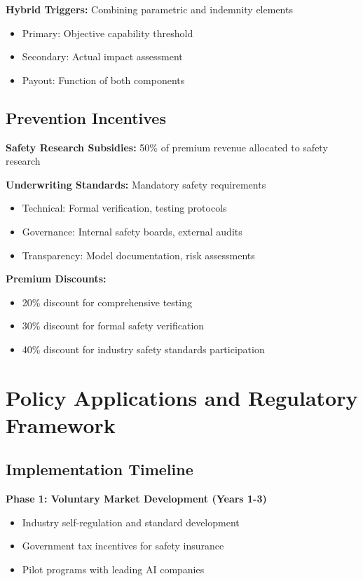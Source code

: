 \documentclass[11pt]{article}
\begin{document}
\textbf{Hybrid Triggers:} Combining parametric and indemnity elements
\begin{itemize}
   \item Primary: Objective capability threshold
   \item Secondary: Actual impact assessment
   \item Payout: Function of both components
\end{itemize}

\subsection{Prevention Incentives}

\textbf{Safety Research Subsidies:} 50\% of premium revenue allocated to safety research

\textbf{Underwriting Standards:} Mandatory safety requirements
\begin{itemize}
   \item Technical: Formal verification, testing protocols
   \item Governance: Internal safety boards, external audits
   \item Transparency: Model documentation, risk assessments
\end{itemize}

\textbf{Premium Discounts:}
\begin{itemize}
   \item 20\% discount for comprehensive testing
   \item 30\% discount for formal safety verification  
   \item 40\% discount for industry safety standards participation
\end{itemize}

\section{Policy Applications and Regulatory Framework}

\subsection{Implementation Timeline}

\textbf{Phase 1: Voluntary Market Development (Years 1-3)}
\begin{itemize}
   \item Industry self-regulation and standard development
   \item Government tax incentives for safety insurance
   \item Pilot programs with leading AI companies
\end{itemize}
\end{document}
